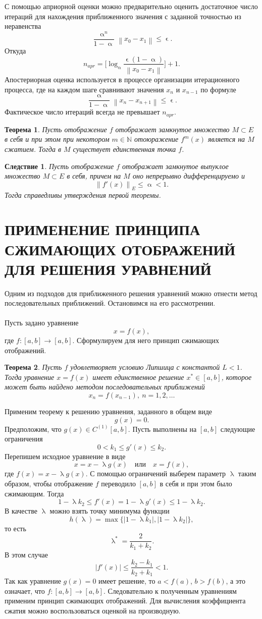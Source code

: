 \documentclass[a4paper, 12pt]{report}
\newcommand\Norm[1]{\left\| #1 \right\|}
\newcommand{\N}{\mathbb{N}}
\renewcommand{\leq}{\leqslant}
\renewcommand{\alpha}{\upalpha}
\renewcommand{\lambda}{\uplambda}
\renewcommand{\epsilon}{\upvarepsilon}
\newtheorem*{theorem}{Теорема}
\newtheorem*{cor}{Следствие}
\begin{document}
	С помощью априорной оценки можно предварительно оценить достаточное число итераций для нахождения приближенного значения с заданной точностью из неравенства $$\dfrac{\alpha^n}{1-\alpha}\Norm{x_0 - x_1}\leq \epsilon.$$
	Откуда $$n_{apr} = \Big[\log_\alpha \dfrac{\epsilon(1-\alpha)}{\Norm{x_0 - x_1}}\Big] + 1.$$
	Апостериорная оценка используется в процессе организации итерационного процесса, где на каждом шаге сравнивают значения $x_n$ и $x_{n-1}$ по формуле $$\dfrac{\alpha}{1 - \alpha}\Norm{x_n - x_{n+1}} \leq \epsilon.$$
	Фактическое число итераций всегда не превышает $n_{apr}$.
	\begin{theorem}
		Пусть отображение $f$ отображает замкнутое множество $M\subset E$ в себя и при этом при некотором $m\in \N$ отоюражение $f^m(x)$ является на $M$ сжатием. Тогда в $M$ существует единственная точка $f$.
	\end{theorem}
	\begin{cor}
		Пусть отображение $f$ отображает замкнутое выпуклое множество $M\subset E$ в себя, причем на $M$ оно непрерывно дифференцируемо и $$\Norm{f'(x)}_E\leq \alpha < 1.$$ Тогда справедливы утверждения первой теоремы.
	\end{cor}
	\section*{ПРИМЕНЕНИЕ ПРИНЦИПА СЖИМАЮЩИХ ОТОБРАЖЕНИЙ ДЛЯ РЕШЕНИЯ УРАВНЕНИЙ}
	Одним из подходов для приближенного решения уравнений можно отнести метод последовательных приближений. Остановимся на его рассмотрении.\\\\
	Пусть задано уравнение $$x = f(x),$$ где $f:[a,b] \to [a,b]$. Сформулируем для него принцип сжимающих отображений.
	\begin{theorem}
		Пусть $f$ удовлетворяет условию Липшица с константой $L < 1$. Тогда уравнение $x = f(x)$ имеет единственное решение $x^*\in[a,b]$, которое может быть найдено методом последовательных приближений $$x_n = f(x_{n-1}),\ n=1,2,\ldots$$
	\end{theorem}
	Применим теорему к решению уравнения, заданного в общем виде $$g(x) = 0.$$
	Предположим, что $g(x) \in C^{(1)}[a,b]$. Пусть выполнены на $[a,b]$ следующие ограничения $$0<k_1\leq g'(x)\leq k_2.$$
	Перепишем исходное уравнение в виде $$x = x-\lambda g(x)\quad \text{или} \quad x = f(x),$$ где $f(x) = x-\lambda g(x)$. С помощью ограничений выберем параметр $\lambda$ таким образом, чтобы отображение $f$ переводило $[a,b]$ в себя и при этом было сжимающим. Тогда $$1 - \lambda k_2 \leq f'(x) = 1 - \lambda g'(x) \leq 1 - \lambda k_2.$$
	В качестве $\lambda$ можно взять точку минимума функции $$h(\lambda) = \max \{|1-\lambda k_1|, |1-\lambda k_2|\},$$
	то есть $$\lambda^* = \dfrac{2}{k_1 + k_2}.$$
	В этом случае $$|f'(x)| \leq \dfrac{k_2-k_1}{k_2 + k_1} < 1.$$
	Так как уравнение $g(x) = 0$ имеет решение, то $a < f(a)$, $b > f(b)$, а это означает, что $f:[a,b]\to [a,b]$. Следовательно к полученным уравнениям применим принцип сжимающих отображений. Для вычисления коэффициента сжатия можно воспользоваться оценкой на производную.
\end{document}
